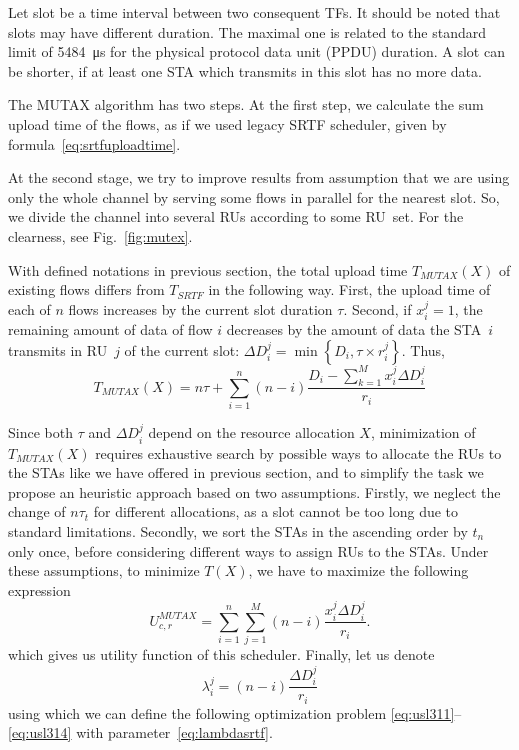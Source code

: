 Let slot be a time interval between two consequent TFs.
It should be noted that slots may have different duration. The maximal one is related to the standard limit of \SI{5484}{\us} for the physical protocol data unit (PPDU) duration. A slot can be shorter, if at least one STA which transmits in this slot has no more data.

The MUTAX algorithm has two steps. At the first step, we calculate the sum upload time of the flows, as if we used legacy SRTF scheduler, given by formula~\eqref{eq:srtfuploadtime}.

At the second stage, we try to improve results from assumption that we are using only the whole channel by serving some flows in parallel for the nearest slot. So, we divide the channel into several RUs according to some RU~set. For the clearness, see Fig.~\ref{fig:mutex}.

With defined notations in previous section, the total upload time $T_{MUTAX}\left(X\right)$ of existing flows differs from $T_{SRTF}$ in the following way. First, the upload time of each of $n$ flows increases by the current slot duration $\tau$. Second, if $x_i^j=1$, the remaining amount of data of flow $i$ decreases by the amount of data the STA~$i$ transmits in RU~$j$ of the current slot: $\Delta D_i^j = \min\left\{D_i, \tau \times r_{i}^{j}\right\}$. Thus,  
\begin{equation}
T_{MUTAX}\left(X\right) = n \tau + \sum_{i = 1}^{n} \left(n - i\right) \frac{D_i -  \sum_{k = 1}^{M} x_i^j \Delta D_i^j}{r_{i}}
\end{equation}

Since both $\tau$ and  $\Delta D_i^j$ depend on the resource allocation $X$, minimization of $T_{MUTAX}(X)$ requires exhaustive search by possible ways to allocate the RUs to the STAs like we have offered in previous section, and to simplify the task we propose an heuristic approach based on two assumptions.
Firstly, we neglect the change of $n \tau_t$ for different allocations, as a slot cannot be too long due to standard limitations.
Secondly, we sort the STAs in the ascending order by $t_n$ only once, before considering different ways to assign RUs to the STAs.
Under these assumptions, to minimize  $T(X)$, we have to maximize the following expression 
\begin{equation}
\label{eq:11axsrtfutility}
U_{c,r}^{MUTAX} = 
\sum_{i = 1}^{n} \sum_{j = 1}^{M } \left(n - i\right) \frac{x_i^j \Delta D_i^j}{r_{i}}.
\end{equation}
which gives us utility function of this scheduler. Finally, let us denote 
\begin{equation}
\label{eq:lambdasrtf}
\lambda_i^j = \left(n - i\right) \frac{\Delta D_i^j}{r_{i}}
\end{equation}
using which we can define the following optimization problem \eqref{eq:usl311}--\eqref{eq:usl314} with parameter~\eqref{eq:lambdasrtf}.


